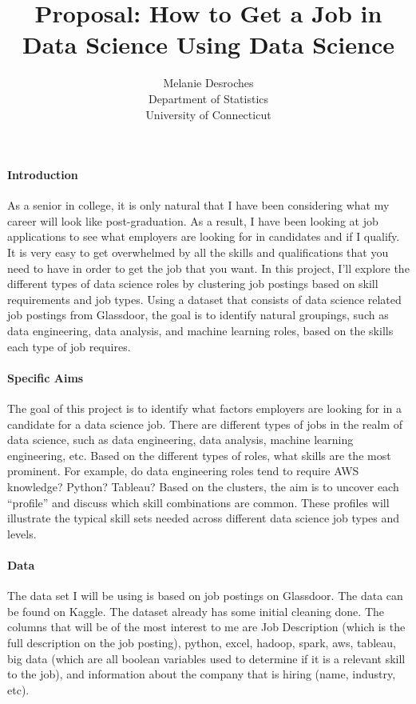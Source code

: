 \documentclass[12pt]{article}
\title{Proposal: How to Get a Job in Data Science Using Data Science}
\author{Melanie Desroches\\
  Department of Statistics\\
  University of Connecticut
}
\begin{document}
\maketitle


\paragraph{Introduction}


As a senior in college, it is only natural that I have been considering what my career will look like post-graduation.
As a result, I have been looking at job applications to see what employers are looking for in candidates and if I qualify. 
It is very easy to get overwhelmed by all the skills and qualifications that you need to have in order to get the job that 
you want. In this project, I’ll explore the different types of data science roles by clustering job postings based on skill 
requirements and job types. Using a dataset that consists of data science related job postings from Glassdoor, the goal is to
identify natural groupings, such as data engineering, data analysis, and machine learning roles, based on the skills each type 
of job requires.

\paragraph{Specific Aims}

The goal of this project is to identify what factors employers are looking for in a candidate for a data science job.
There are different types of jobs in the realm of data science, such as data engineering, data analysis, machine learning 
engineering, etc. Based on the different types of roles, what skills are the most prominent. For example, do data engineering
roles tend to require AWS knowledge? Python? Tableau? Based on the clusters, the aim is to uncover each “profile” and discuss 
which skill combinations are common. These profiles will illustrate the typical skill sets needed across different data science job types 
and levels.

\paragraph{Data}

The data set I will be using is based on job postings on Glassdoor. The data can be found on Kaggle. The dataset already has
some initial cleaning done. The columns that will be of the most interest to me are Job Description (which is the full description
on the job posting), python, excel, hadoop, spark, aws, tableau, big data (which are all boolean variables used to determine
if it is a relevant skill to the job), and information about the company that is hiring (name, industry, etc).
\end{document}
